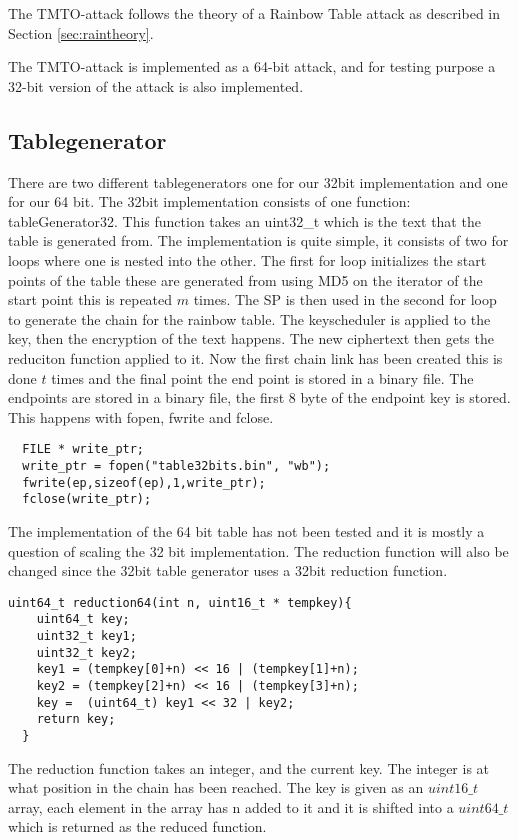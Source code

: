 The TMTO-attack follows the theory of a Rainbow Table attack as
described in Section \ref{sec:raintheory}.

The TMTO-attack is implemented as a 64-bit attack, and for testing
purpose a 32-bit version of the attack is also implemented.

\subsection{Tablegenerator}
There are two different tablegenerators one for our 32bit implementation and one for our 64 bit.
The 32bit implementation consists of one function: tableGenerator32. This function takes an uint32\_t which is the text that the table is generated from. The implementation is quite simple, it consists of two for loops where one is nested into the other. The first for loop initializes the start points of the table these are generated from using MD5 on the iterator of the start point this is repeated $m$ times.
The SP is then used in the second for loop to generate the chain for the rainbow table.
The keyscheduler is applied to the key, then the encryption of the text happens. The new ciphertext then gets the reduciton function applied to it. Now the first chain link has been created this is done $t$ times and the final point the end point is stored in a binary file.
The endpoints are stored in a binary file, the first 8 byte of the endpoint key is stored. This happens with fopen, fwrite and fclose.
\lstset{language=C}
\begin{lstlisting}
  FILE * write_ptr;
  write_ptr = fopen("table32bits.bin", "wb");
  fwrite(ep,sizeof(ep),1,write_ptr);
  fclose(write_ptr);
\end{lstlisting}
The implementation of the 64 bit table has not been tested and it is mostly a question of scaling the 32 bit implementation. The reduction function will also be changed since the 32bit table generator uses a 32bit reduction function.
\begin{lstlisting}
uint64_t reduction64(int n, uint16_t * tempkey){
    uint64_t key;
    uint32_t key1;
    uint32_t key2;
    key1 = (tempkey[0]+n) << 16 | (tempkey[1]+n);
    key2 = (tempkey[2]+n) << 16 | (tempkey[3]+n);
    key =  (uint64_t) key1 << 32 | key2;
    return key;
  }
\end{lstlisting}

The reduction function takes an integer, and the current key. The integer is at what position in the chain has been reached. The key is given as an $uint16\_t$ array, each element in the array has n added to it and it is shifted into a $uint64\_t$ which is returned as the reduced function.

